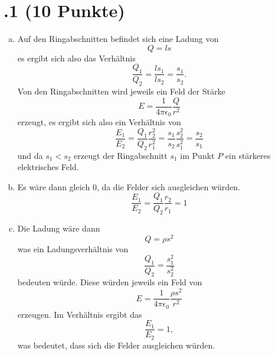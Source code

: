 \section*{\nr.1 \titone (10 Punkte)}
\begin{enumerate}[(a)]
\item Auf den Ringabschnitten befindet sich eine Ladung von
\begin{equation}
	Q=ls
\end{equation}
es ergibt sich also das Verhältnis
\begin{equation}
  \frac{Q_1}{Q_2}= \frac{ls_1}{ls_2} = \frac{s_1}{s_2}.
\end{equation}
Von den Ringabschnitten wird jeweils ein Feld der Stärke
\begin{equation}
  E= \frac{1}{4\pi\epsilon_0}\frac{Q}{r^2}
\end{equation}
erzeugt, es ergibt sich also ein Verhältnis von
\begin{equation}
  \frac{E_1}{E_2}=\frac{Q_1}{Q_2}\frac{r_2^2}{r_1^2}=\frac{s_1}{s_2}\frac{s_2^2}{s_1^2}=\frac{s_2}{s_1}
\end{equation}
und da $s_1<s_2$ erzeugt der Ringabschnitt $s_1$ im Punkt $P$ ein stärkeres elektrisches Feld.

\item Es wäre dann gleich $0$, da die Felder sich ausgleichen würden.
\begin{equation}
  \frac{E_1}{E_2}=\frac{Q_1}{Q_2}\frac{r_2}{r_1}=1
\end{equation}

\item Die Ladung wäre dann 
\begin{equation}
  Q=\rho s^2
\end{equation}
was ein Ladungsverhältnis von 
\begin{equation}
  \frac{Q_1}{Q_2}= \frac{s_1^2}{s_2^2}
\end{equation}
bedeuten würde. Diese würden jeweils ein Feld von
\begin{equation}
  E=\frac{1}{4\pi\epsilon_0}\frac{\rho s^2}{r^2}
\end{equation}
erzeugen.
Im Verhältnis ergibt das
\begin{equation}
  \frac{E_1}{E_2}=1, 
\end{equation}
was bedeutet, dass sich die Felder ausgleichen würden.



\end{enumerate}